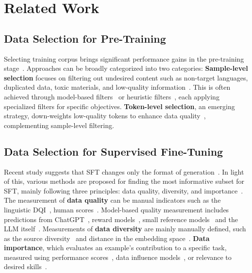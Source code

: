 \section{Related Work}
\label{sec:related-work}
\subsection{Data Selection for Pre-Training}
Selecting training corpus brings significant performance gains in the pre-training stage~\cite{wenzek2019ccnet,mann2020language,zhao2023survey,penedo2023refinedweb,txt360data2024}. 
Approaches can be broadly categorized into two categories: \textbf{Sample-level selection} focuses on filtering out undesired content such as non-target languages, duplicated data, toxic materials, and low-quality information~\cite{albalak2024survey}. This is often achieved through model-based filters~\cite{joulin2016fasttext,engstrom2024dsdm,wettig2024qurating} or heuristic filters~\cite{wenzek2019ccnet,lee2021deduplicating,laurenccon2022bigscience}, each applying specialized filters for specific objectives. 
\textbf{Token-level selection}, an emerging strategy, down-weights low-quality tokens to enhance data quality~\cite{lin2024rho}, complementing sample-level filtering.




\subsection{Data Selection for Supervised Fine-Tuning}
Recent study suggests that SFT changes only the format of generation~\cite{zhou2024lima}. In light of this, various methods are proposed for finding the most informative subset for SFT, mainly following three principles: data quality, diversity, and importance~\cite{qin2024unleashing}. The measurement of \textbf{data quality} can be manual indicators such as the linguistic DQI~\cite{mishra2020we}, human scores~\cite{zhou2024lima}. Model-based quality measurement includes predictions from ChatGPT~\cite{chen2024alpagasus}, reward models~\cite{cao2023instruction}, small reference models~\cite{ankner2024perplexed} and the LLM itself~\cite{li2024quantity}. 
Measurements of \textbf{data diversity} are mainly manually defined, such as the source diversity~\cite{mukherjee2023orca, wang2023far} and distance in the embedding space~\cite{wu2023self,xu2023rethinking,du2023mods,liu2024what}. 
\textbf{Data importance}, which evaluates an example’s contribution to a specific task, measured using performance scores~\cite{engstrom2024dsdm}, data influence models~\cite{yu2024mates}, or relevance to desired skills~\cite{chen2024skill}.


